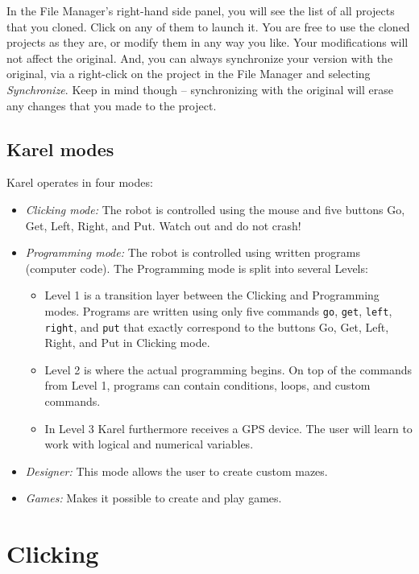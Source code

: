 In the File Manager's right-hand side panel, you will see the list of all 
projects that you cloned. Click on any of them to launch it. You are free to 
use the cloned projects as they are, or modify them in any way you like. Your 
modifications will not affect the original. And, you can 
always synchronize your version with the original, via 
a right-click on the project in the File Manager and selecting {\em Synchronize}.
Keep in mind though -- synchronizing with the original will erase any changes that 
you made to the project.

\subsection{Karel modes} \label{levels}

Karel operates in four modes:
\begin{itemize}
\item {\em Clicking mode:} The robot is controlled using the mouse and five buttons Go, Get, Left, Right, and Put. 
      Watch out and do not crash!
\item {\em Programming mode:} The robot is controlled using written programs (computer code). The Programming mode is 
      split into several Levels:
\begin{itemize}
\item Level 1 is a transition layer between the Clicking and Programming modes. Programs are written using only 
      five commands {\tt go}, {\tt get}, {\tt left}, {\tt right}, and {\tt put} that exactly correspond to 
      the buttons Go, Get, Left, Right, and Put in Clicking mode.
\item Level 2 is where the actual programming begins. On top of the commands from Level 1, programs can contain 
      conditions, loops, and custom commands.
\item In Level 3 Karel furthermore receives a GPS device. The user will learn to work with logical 
      and numerical variables. 
\end{itemize}
\item {\em Designer:} This mode allows the user to create custom mazes.
\item {\em Games:} Makes it possible to create and play games. 
\end{itemize}


\section{Clicking} \label{sec:manual}

